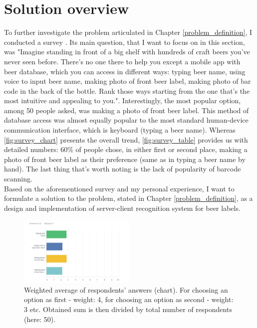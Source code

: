 \documentclass[11pt]{article}
\begin{document}
\section{Solution overview} \label{solution_overview}
To further investigate the problem articulated in Chapter \ref{problem_definition}, I conducted a survey \cite{survey}. Its main question, that I want to focus on in this section, was "Imagine standing in front of a big shelf with hundreds of craft beers you've never seen before. There's no one there to help you except a mobile app with beer database, which you can access in different ways: typing beer name, using voice to input beer name, making photo of front beer label, making photo of bar code in the back of the bottle. Rank those ways starting from the one that's the most intuitive and appealing to you.". Interestingly, the most popular option, among 50 people asked, was making a photo of front beer label. This method of database access was almost equally popular to the most standard human-device communication interface, which is keyboard (typing a beer name). Whereas \autoref{fig:survey_chart} presents the overall trend, \autoref{fig:survey_table} provides us with detailed numbers: 60\% of people chose, in either first or second place, making a photo of front beer label as their preference (same as in typing a beer name by hand). The last thing that's worth noting is the lack of popularity of barcode scanning.\\

Based on the aforementioned survey and my personal experience, I want to formulate a solution to the problem, stated in Chapter \ref{problem_definition}, as a design and implementation of server-client recognition system for beer labels.

\begin{figure}[h]
\includegraphics[width=0.5\textwidth]{survey_chart}
\centering
\caption{Weighted average of respondents' answers (chart). For choosing an option as first - weight: 4, for choosing an option as second - weight: 3 etc. Obtained sum is then divided by total number of respondents (here: 50).}
\label{fig:survey_chart}
\end{figure}
\end{document}
